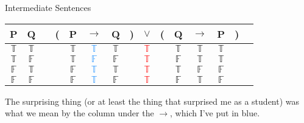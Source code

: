 \documentclass[
  ignorenonframetext,
]{beamer}
\renewcommand{\,}{\text{, }}
\def\True{\mathbb{T}}
\def\False{\mathbb{F}}
\begin{document}
\begin{frame}{Intermediate Sentences}
\protect\hypertarget{intermediate-sentences}{}

\begin{center}
\begin{tabular}{@{ }c@{ }@{ }c | c@{ }@{}c@{}@{ }c@{ }@{ }c@{ }@{ }c@{ }@{}c@{}@{ }c@{ }@{}c@{}@{ }c@{ }@{ }c@{ }@{ }c@{ }@{}c@{}@{ }c}
P & Q &  & ( & P & $\rightarrow$ & Q & ) & $\lor$ & ( & Q & $\rightarrow$ & P & ) & \\
\hline 
$\True$ & $\True$ &  &  & $\True$ & \textcolor{dodgerblue}{$\True$} & $\True$ &  & \textcolor{red}{$\True$} &  & $\True$ & $\True$ & $\True$ &  & \\
$\True$ & $\False$ &  &  & $\True$ & \textcolor{dodgerblue}{$\False$} & $\False$ &  & \textcolor{red}{$\True$} &  & $\False$ & $\True$ & $\True$ &  & \\
$\False$ & $\True$ &  &  & $\False$ & \textcolor{dodgerblue}{$\True$} & $\True$ &  & \textcolor{red}{$\True$} &  & $\True$ & $\False$ & $\False$ &  & \\
$\False$ & $\False$ &  &  & $\False$ & \textcolor{dodgerblue}{$\True$} & $\False$ &  & \textcolor{red}{$\True$} &  & $\False$ & $\True$ & $\False$ &  & \\
\end{tabular}
\bigskip
\end{center}

The surprising thing (or at least the thing that surprised me as a
student) was what we mean by the column under the \(\rightarrow\), which
I've put in blue.

\end{frame}
\end{document}
